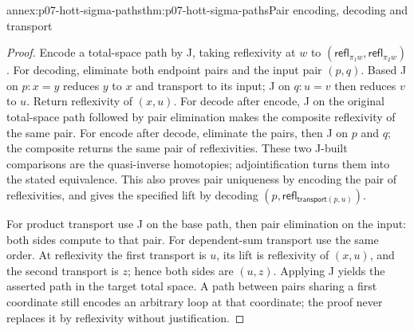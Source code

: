 \begin{annexitem}{annex:p07-hott-sigma-paths}{thm:p07-hott-sigma-paths}{Pair encoding, decoding and transport}
\begin{proof}
Encode a total-space path by J, taking reflexivity at $w$ to
$(\mathsf{refl}_{\pi_1w},\mathsf{refl}_{\pi_2w})$.
For decoding, eliminate both endpoint pairs and the input pair $(p,q)$.
Based J on $p:x=y$ reduces $y$ to $x$ and transport to its input;
J on $q:u=v$ then reduces $v$ to $u$. Return reflexivity of $(x,u)$.
For decode after encode, J on the original total-space path followed
by pair elimination makes the composite reflexivity of the same pair.
For encode after decode, eliminate the pairs, then J on $p$ and $q$;
the composite returns the same pair of reflexivities. These two J-built
comparisons are the quasi-inverse homotopies; adjointification turns
them into the stated equivalence. This also proves pair uniqueness
by encoding the pair of reflexivities, and gives the specified lift
by decoding $(p,\mathsf{refl}_{\mathsf{transport}(p,u)})$.

For product transport use J on the base path, then pair elimination
on the input: both sides compute to that pair. For dependent-sum
transport use the same order. At reflexivity the first transport is
$u$, its lift is reflexivity of $(x,u)$, and the second transport is
$z$; hence both sides are $(u,z)$. Applying J yields the asserted
path in the target total space. A path between pairs sharing a first
coordinate still encodes an arbitrary loop at that coordinate; the
proof never replaces it by reflexivity without justification.
\end{proof}
\end{annexitem}

